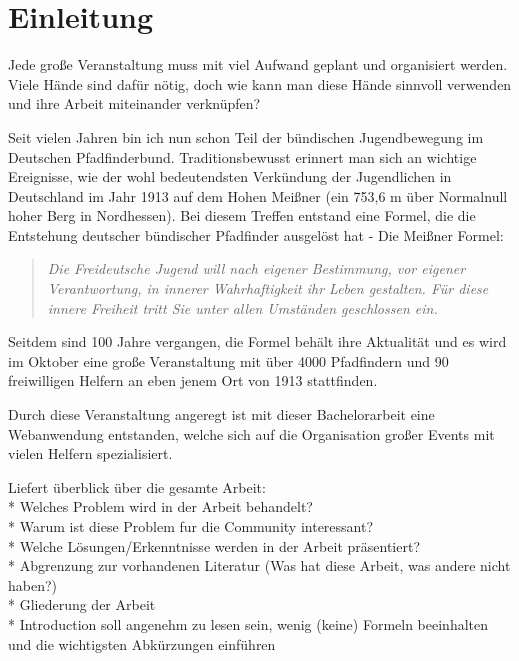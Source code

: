 \chapter{Einleitung}
Jede große Veranstaltung muss mit viel Aufwand geplant und organisiert werden. Viele Hände sind dafür nötig, doch wie kann man diese Hände sinnvoll verwenden und ihre Arbeit miteinander verknüpfen?\par

Seit vielen Jahren bin ich nun schon Teil der bündischen Jugendbewegung im Deutschen Pfadfinderbund. Traditionsbewusst erinnert man sich an wichtige Ereignisse, wie der wohl bedeutendsten Verkündung der Jugendlichen in Deutschland im Jahr 1913 auf dem Hohen Meißner (ein 753,6 m über Normalnull hoher Berg in Nordhessen). Bei diesem Treffen entstand eine Formel, die die Entstehung deutscher bündischer Pfadfinder ausgelöst hat - Die Meißner Formel:
\begin{quote}
	\textit{\glqq Die Freideutsche Jugend will nach eigener Bestimmung, vor eigener Verantwortung, in innerer Wahrhaftigkeit ihr Leben gestalten. Für diese innere Freiheit tritt Sie unter allen Umständen geschlossen ein.\grqq{}}\cite[S. 109]{meissnerformel}
\end{quote}
Seitdem sind 100 Jahre vergangen, die Formel behält ihre Aktualität und es wird im Oktober eine große Veranstaltung mit über 4000 Pfadfindern und 90 freiwilligen Helfern an eben jenem Ort von 1913 stattfinden.\par

Durch diese Veranstaltung angeregt ist mit dieser Bachelorarbeit eine Webanwendung entstanden, welche sich auf die Organisation großer Events mit vielen Helfern spezialisiert.\par

Liefert überblick über die gesamte Arbeit: \\
* Welches Problem wird in der Arbeit behandelt?\\
* Warum ist diese Problem fur die Community interessant? \\
* Welche Lösungen/Erkenntnisse werden in der Arbeit präsentiert?\\
* Abgrenzung zur vorhandenen Literatur (Was hat diese Arbeit, was andere nicht haben?)\\
* Gliederung der Arbeit\\
* Introduction soll angenehm zu lesen sein, wenig (keine) Formeln beeinhalten und die wichtigsten Abkürzungen einführen

